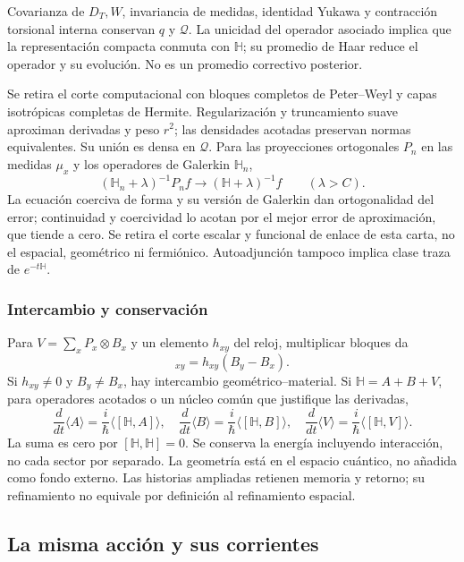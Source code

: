 Covarianza de $D_T,W$, invariancia de medidas, identidad Yukawa y
contracción torsional interna conservan $q$ y $\mathcal Q$.
La unicidad del operador asociado implica que la representación
compacta conmuta con $\mathbb H$; su promedio de Haar reduce
el operador y su evolución. No es un promedio correctivo posterior.

Se retira el corte computacional con bloques completos de Peter--Weyl
y capas isotrópicas completas de Hermite.
Regularización y truncamiento suave aproximan derivadas y peso
$r^2$; las densidades acotadas preservan normas equivalentes.
Su unión es densa en $\mathcal Q$. Para las proyecciones ortogonales
$P_n$ en las medidas $\mu_x$ y los operadores de Galerkin
$\mathbb H_n$,
\[
(\mathbb H_n+\lambda)^{-1}P_nf\longrightarrow
(\mathbb H+\lambda)^{-1}f\qquad(\lambda>C).
\]
La ecuación coerciva de forma y su versión de Galerkin dan
ortogonalidad del error; continuidad y coercividad lo acotan por
el mejor error de aproximación, que tiende a cero.
Se retira el corte escalar y funcional de enlace de esta carta,
no el espacial, geométrico ni fermiónico.
Autoadjunción tampoco implica clase traza de $e^{-t\mathbb H}$.

\subsubsection{Intercambio y conservación}
\label{hmtcuatro:gea:intercambio}

Para $V=\sum_xP_x\otimes B_x$ y un elemento $h_{xy}$ del reloj,
multiplicar bloques da
\begin{equation}
[H_{\rm clk}\otimes I,V]_{xy}=h_{xy}(B_y-B_x).
\label{hmtcuatro:gea:conmutador}
\end{equation}
Si $h_{xy}\ne0$ y $B_y\ne B_x$, hay intercambio
geométrico--material. Si $\mathbb H=A+B+V$, para operadores
acotados o un núcleo común que justifique las derivadas,
\[
\frac d{dt}\langle A\rangle=\frac i\hbar\langle[\mathbb H,A]\rangle,
\quad
\frac d{dt}\langle B\rangle=\frac i\hbar\langle[\mathbb H,B]\rangle,
\quad
\frac d{dt}\langle V\rangle=\frac i\hbar\langle[\mathbb H,V]\rangle.
\]
La suma es cero por $[\mathbb H,\mathbb H]=0$.
Se conserva la energía incluyendo interacción, no cada sector
por separado. La geometría está en el espacio cuántico, no añadida
como fondo externo. Las historias ampliadas retienen memoria y retorno;
su refinamiento no equivale por definición al refinamiento espacial.

\subsection{La misma acción y sus corrientes}
\label{hmtcuatro:gea:accion}

